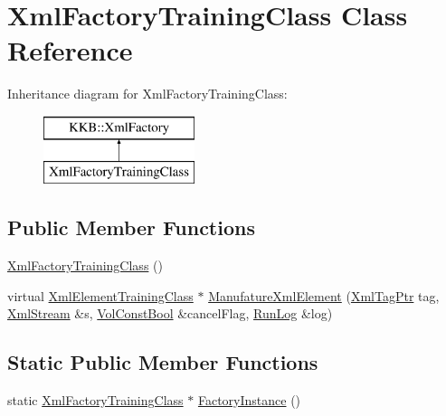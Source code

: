 \hypertarget{class_xml_factory_training_class}{}\section{Xml\+Factory\+Training\+Class Class Reference}
\label{class_xml_factory_training_class}
Inheritance diagram for Xml\+Factory\+Training\+Class\+:\begin{figure}[H]
\begin{center}
\leavevmode
\includegraphics[height=2.000000cm]{class_xml_factory_training_class}
\end{center}
\end{figure}
\subsection*{Public Member Functions}
\begin{DoxyCompactItemize}
\item 
\hyperlink{class_xml_factory_training_class_adb2b8b7279dfacddcfec16c1c824ea98}{Xml\+Factory\+Training\+Class} ()
\item 
virtual \hyperlink{namespace_k_k_m_l_l_a0f118c0155cb57cdd78c2bb6e7536353}{Xml\+Element\+Training\+Class} $\ast$ \hyperlink{class_xml_factory_training_class_ae077c440ed4831713fb3ea4e23223b55}{Manufature\+Xml\+Element} (\hyperlink{namespace_k_k_b_a9253a3ea8a5da18ca82be4ca2b390ef0}{Xml\+Tag\+Ptr} tag, \hyperlink{class_k_k_b_1_1_xml_stream}{Xml\+Stream} \&s, \hyperlink{namespace_k_k_b_a7d390f568e2831fb76b86b56c87bf92f}{Vol\+Const\+Bool} \&cancel\+Flag, \hyperlink{class_k_k_b_1_1_run_log}{Run\+Log} \&log)
\end{DoxyCompactItemize}
\subsection*{Static Public Member Functions}
\begin{DoxyCompactItemize}
\item 
static \hyperlink{class_xml_factory_training_class}{Xml\+Factory\+Training\+Class} $\ast$ \hyperlink{class_xml_factory_training_class_af6e7c0539027c74b7ec494e644a83d3b}{Factory\+Instance} ()
\end{DoxyCompactItemize}
